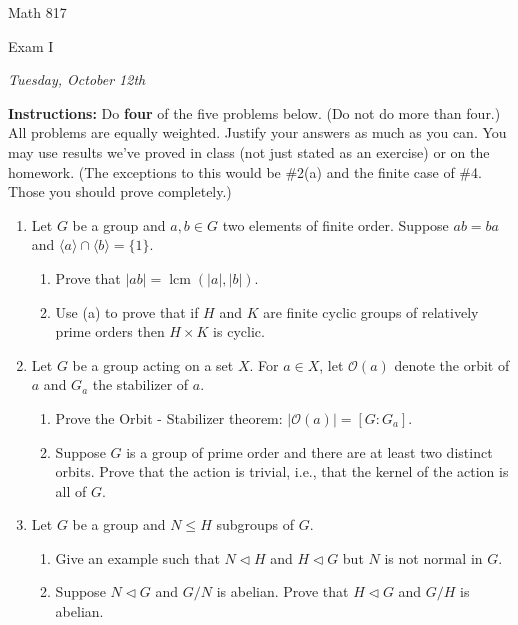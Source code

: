 \documentclass[12pt]{article}
\begin{document}
\centerline{\bigbf Math 817}
\medskip
\centerline{\bigbf Exam I}
\medskip
\centerline{\it Tuesday, October 12th }

\medskip

{\bf Instructions:}  Do {\bf four} of the five problems below. (Do not do more than four.)   All problems are equally weighted.  Justify your answers as much as you can.  You may use results we've proved in class (not just stated as an exercise) or on the homework.  (The exceptions to this would be \#2(a) and the finite case of \#4.  Those you should prove completely.)



\begin{enumerate}

\item Let $G$ be a group and $a,b\in G$ two elements of finite order.  
Suppose $ab=ba$ and $\langle a\rangle \cap \langle b\rangle =\{1\}$.  
\begin{enumerate}
\item Prove that $|ab|=\operatorname{lcm}(|a|,|b|)$.
\item Use (a) to prove that if $H$ and $K$ are finite cyclic groups of relatively prime orders then $H\times K$ is cyclic.
\end{enumerate}

\medskip

\item Let $G$ be a group acting on a set $X$.  For $a\in X$, let $\mathcal O(a)$ denote the orbit of $a$ and $G_a$ the stabilizer of $a$.  
\begin{enumerate} 
\item Prove the Orbit - Stabilizer theorem:  $|\mathcal O(a)|=[G:G_a]$.
\item Suppose $G$ is a group of prime order and there are at least two distinct orbits.  Prove that the action is trivial, i.e., that the kernel of the action is all of $G$.  \end{enumerate}

\medskip


\item Let $G$ be a group and $N\le H$ subgroups of $G$.
\begin{enumerate} 
\item Give an example such that $N\triangleleft H$ and $H\triangleleft G$ but $N$ is not normal in $G$.
\item Suppose $N\triangleleft G$ and $G/N$ is abelian.  Prove that $H\triangleleft G$ and $G/H$ is abelian.
\end{enumerate}



\end{enumerate}
\end{document}
